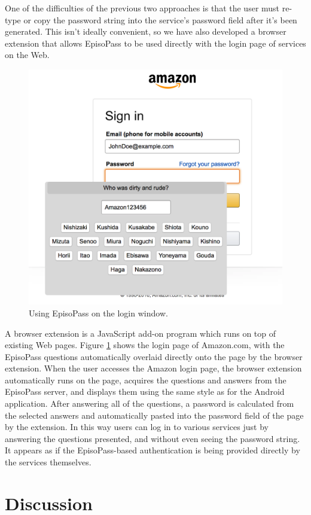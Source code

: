 \documentclass[runningheads,a4paper]{llncs}
\begin{document}
One of the difficulties of the previous two approaches is that the user 
must re-type or copy the password string into the service's password
field after it's been generated.
This isn't ideally convenient, so we have also developed a browser 
extension that allows EpisoPass to be used directly with the login
page of services on the Web.

\begin{figure}
\centering
\includegraphics[width=0.8\columnwidth]{figures/aeff16ffcab956e554364e9e5aca8359}
\caption{Using EpisoPass on the login window.}
\label{extension}
\end{figure}

A browser extension is a JavaScript add-on program which runs
on top of existing Web pages.
%
Figure \ref{extension} shows the login page of Amazon.com, with the 
EpisoPass questions automatically overlaid directly onto the page
by the browser extension.
%
When the user accesses the Amazon login page,
the browser extension automatically runs on the page,
acquires the questions and answers from the EpisoPass server,
and displays them using the same style as for the Android application.
%
After answering all of the questions, a password is calculated from the
selected answers and automatically pasted into the password field of the page
by the extension. In this way users can log in to various services just by
answering the questions presented, and without even seeing the password string.
It appears as if the EpisoPass-based authentication is being provided directly
by the services themselves.

\section{Discussion}
\end{document}
